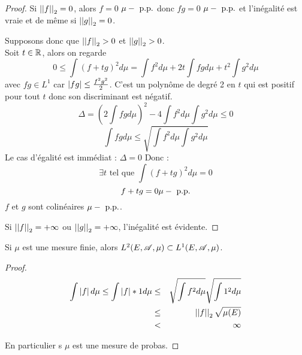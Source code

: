 \begin{proof}
	Si $\left|\left|f\right|\right|_2 = 0$, alors $f = 0$ $\mu-\text{ p.p.}$ donc $fg = 0$ $\mu-\text{ p.p.}$ et l'inégalité est vraie et de
	même si $\left|\left|g\right|\right|_2 = 0$.

	Supposons donc que $\left|\left|f\right|\right|_2 > 0$ et $\left|\left|g\right|\right|_2 > 0$.\\
	Soit $t \in \mathbb{R}$, alors on regarde
	$$ 0 \leq \int (f + tg)^2 d \mu = \int f^2 d \mu + 2t \int fg d \mu + t^2 \int g^2 d \mu$$
	avec $fg \in L^1$ car $\left|fg\right| \leq \frac{f^2g^2}{2}$.
	C'est un polynôme de degré 2 en $t$ qui est positif pour tout $t$ donc son discriminant est négatif.
	$$  \Delta = (2 \int fg d \mu)^2 - 4 \int f^2 d \mu \int g^2 d \mu \leq 0$$
	$$ \int fg d \mu \leq \sqrt{\int f^2 d \mu \int g^2 d \mu}$$
	Le cas d'égalité est immédiat : $\Delta = 0$ Donc :
	$$\exists t \text { tel que } \int (f + tg)^2 d \mu  = 0$$
	$$ f + tg = 0  \mu-\text{ p.p.}$$
	$f$ et $g$ sont colinéaires $\mu-\text{ p.p.}$.

	Si $\left|\left|f\right|\right|_2 = +  \infty$ ou $\left|\left|g\right|\right|_2 = +  \infty$, l'inégalité est évidente.
\end{proof}

\begin{coro}
	Si $\mu$ est une mesure finie, alors $L^2(E, \mathscr{A}, \mu) \subset L^1(E, \mathscr{A}, \mu)$.
\end{coro}

\begin{proof}
	\begin{eqnarray*}
		\int \left|f\right| d \mu \leq \int \left|f\right|*1 d \mu &\leq& \sqrt{\int f^2 d \mu} \sqrt{\int 1^2 d \mu} \\
		& \leq & \left|\left|f\right|\right|_2 \sqrt{\mu(E)} \\
		& < & \infty
	\end{eqnarray*}

	En particulier s $\mu$ est une mesure de probas.
\end{proof}



